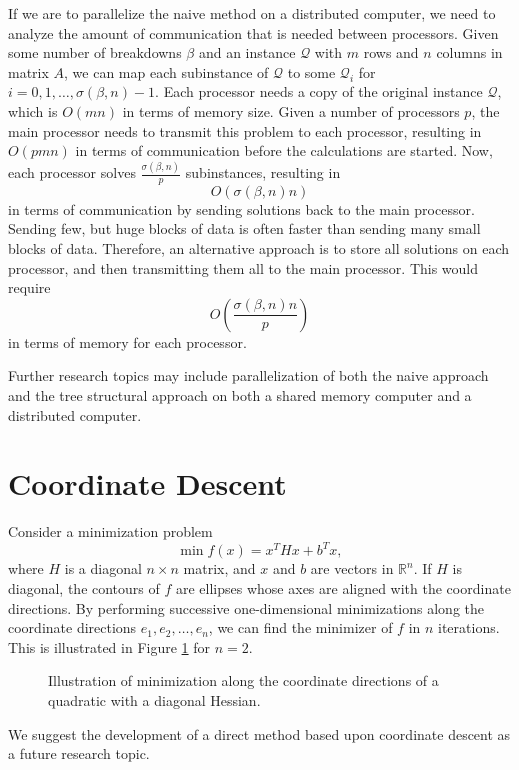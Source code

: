 \documentclass[a4paper,12pt]{report}
\begin{document}
If we are to parallelize the naive method on a distributed computer, we need to
analyze the amount of communication that is needed between processors.
Given some number of breakdowns $\beta$ and an instance $\mathcal{Q}$ with
$m$ rows and $n$ columns in matrix $A$, we can map each subinstance of
$\mathcal{Q}$ to some $\mathcal{Q}_i$ for $i=0,1,\ldots,\sigma(\beta,n) - 1$.
Each processor needs
a copy of the original instance $\mathcal{Q}$, which is $O(mn)$ in terms
of memory size. Given a number of processors $p$, the main processor needs to
transmit this problem to each processor, resulting in $O(pmn)$ in terms of
communication before the calculations are started. Now, each
processor solves $\frac{\sigma(\beta, n)}{p}$ subinstances, resulting in
\[
O(\sigma(\beta, n)n)
\]
in terms of communication by sending solutions back to the main processor.
Sending few, but huge blocks of data is often faster than sending many small
blocks of data.
Therefore, an alternative approach is to store all solutions on each processor,
and then transmitting them all to the main processor.
This would require
\[
O\left(\frac{\sigma(\beta, n)n}{p}\right)
\]
in terms of memory for each processor.

Further research topics may include parallelization of both the naive approach
and the tree structural approach on both a shared memory computer and a
distributed computer.

\section{Coordinate Descent}
Consider a minimization problem
\[
    \min f(x) = x^T H x + b^T x,
\]
where $H$ is a diagonal $n \times n$ matrix, and $x$ and $b$ are vectors in
$\mathbb{R}^n$.
If $H$ is diagonal, the contours of $f$ are ellipses
whose axes are aligned with the coordinate directions\cite{nocedal}.
By performing successive one-dimensional minimizations along the
coordinate directions $e_1,e_2,\ldots,e_n$, we can find the minimizer of $f$
in $n$ iterations. This is illustrated in Figure \ref{fig:coordinatedescent}
for $n = 2$.

\begin{figure}[ht!]
\centering

\caption{Illustration of minimization along the coordinate directions of a
         quadratic with a diagonal Hessian.}
\label{fig:coordinatedescent}
\end{figure}

We suggest the development of a direct method based upon coordinate
descent as a future research topic.


{}


\onecolumn

\end{document}

